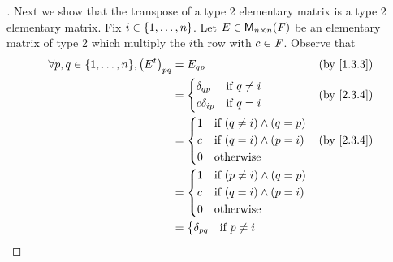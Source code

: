 \begin{proof}[]
  Next we show that the transpose of a type 2 elementary matrix is a type 2 elementary matrix.
  Fix \(i \in \left\lbrace1, \dots, n\right\rbrace\).
  Let \(E \in \mathsf{M}_{{n} \times n}({\mathit{F}})\) be an elementary matrix of type 2 which multiply the \(i\)th row with \(c \in \mathit{F}\).
  Observe that
  \begin{align*}
    \forall p, q \in \set{1, \dots, n}, \pa{\tp{E}}_{p q} & = E_{q p}                                  &  & \text{(by \cref{1.3.3})} \\
                                                          & = \begin{dcases}
                                                                \delta_{q p}   & \text{if } q \neq i \\
                                                                c \delta_{i p} & \text{if } q = i
                                                              \end{dcases}    &  & \text{(by \cref{2.3.4})}                          \\
                                                          & = \begin{dcases}
                                                                1 & \text{if } (q \neq i) \land (q = p) \\
                                                                c & \text{if } (q = i) \land (p = i)    \\
                                                                0 & \text{otherwise}
                                                              \end{dcases} &  & \text{(by \cref{2.3.4})}                             \\
                                                          & = \begin{dcases}
                                                                1 & \text{if } (p \neq i) \land (q = p) \\
                                                                c & \text{if } (q = i) \land (p = i)    \\
                                                                0 & \text{otherwise}
                                                              \end{dcases}                                \\
                                                          & = \begin{dcases}
                                                                \delta_{p q}   & \text{if } p \neq i \\

\end{dcases}
\end{align*}
\end{proof}
